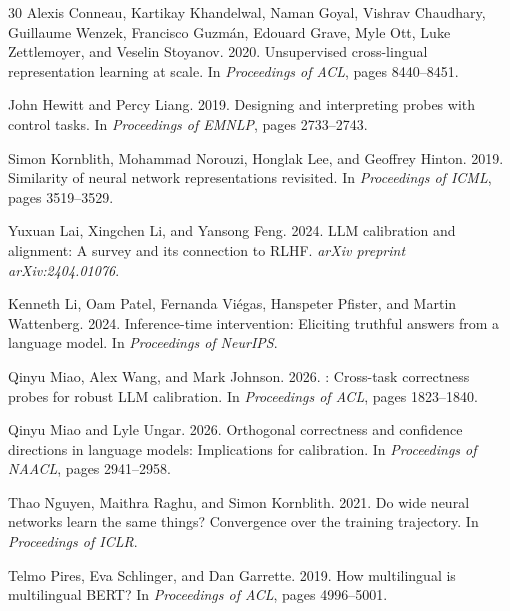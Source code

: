 \documentclass[11pt,a4paper]{article}
\begin{document}
\begin{thebibliography}{30}
Alexis Conneau, Kartikay Khandelwal, Naman Goyal, Vishrav Chaudhary, Guillaume Wenzek, Francisco Guzm{\'a}n, Edouard Grave, Myle Ott, Luke Zettlemoyer, and Veselin Stoyanov. 2020.
\newblock Unsupervised cross-lingual representation learning at scale.
\newblock In \emph{Proceedings of ACL}, pages 8440--8451.

John Hewitt and Percy Liang. 2019.
\newblock Designing and interpreting probes with control tasks.
\newblock In \emph{Proceedings of EMNLP}, pages 2733--2743.

Simon Kornblith, Mohammad Norouzi, Honglak Lee, and Geoffrey Hinton. 2019.
\newblock Similarity of neural network representations revisited.
\newblock In \emph{Proceedings of ICML}, pages 3519--3529.

Yuxuan Lai, Xingchen Li, and Yansong Feng. 2024.
\newblock LLM calibration and alignment: A survey and its connection to RLHF.
\newblock \emph{arXiv preprint arXiv:2404.01076}.

Kenneth Li, Oam Patel, Fernanda Vi{\'e}gas, Hanspeter Pfister, and Martin Wattenberg. 2024.
\newblock Inference-time intervention: Eliciting truthful answers from a language model.
\newblock In \emph{Proceedings of NeurIPS}.

Qinyu Miao, Alex Wang, and Mark Johnson. 2026.
: Cross-task correctness probes for robust LLM calibration.
\newblock In \emph{Proceedings of ACL}, pages 1823--1840.

Qinyu Miao and Lyle Ungar. 2026.
\newblock Orthogonal correctness and confidence directions in language models: Implications for calibration.
\newblock In \emph{Proceedings of NAACL}, pages 2941--2958.

Thao Nguyen, Maithra Raghu, and Simon Kornblith. 2021.
\newblock Do wide neural networks learn the same things? {C}onvergence over the training trajectory.
\newblock In \emph{Proceedings of ICLR}.

Telmo Pires, Eva Schlinger, and Dan Garrette. 2019.
\newblock How multilingual is multilingual {BERT}?
\newblock In \emph{Proceedings of ACL}, pages 4996--5001.


\end{thebibliography}
\end{document}
